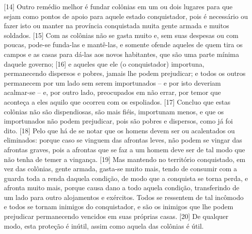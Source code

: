 {[}14{]} Outro remédio melhor é fundar colônias em um ou dois lugares
para que sejam como pontos de apoio para aquele estado conquistador,
pois é necessário ou fazer isto ou manter na província conquistada muita
gente armada e muitos soldados. {[}15{]} Com as colônias não se gasta
muito e, sem suas despesas ou com poucas, pode-se funda-las e mantê-las,
e somente ofende aqueles de quem tira os campos e as casas para dá-las
aos novos habitantes, que são uma parte mínima daquele governo; {[}16{]}
e aqueles que ele (o conquistador) importuna, permanecendo dispersos e
pobres, jamais lhe podem prejudicar; e todos os outros permanecem por um
lado sem serem importunados -- e por isto deveriam acalmar-se -- e, por
outro lado, preocupados em não errar, por temor que aconteça a eles
aquilo que ocorreu com os espoliados. {[}17{]} Concluo que estas
colônias não são dispendiosas, são mais fiéis, importunam menos, e que
os importunados não podem prejudicar, pois são pobres e dispersos, como
já foi dito. {[}18{]} Pelo que há de se notar que os homens devem ser ou
acalentados ou eliminados: porque caso se vinguem das afrontas leves,
não podem se vingar das afrontas graves, pois a afrontas que se faz a um
homem deve ser de tal modo que não tenha de temer a vingança. {[}19{]}
Mas mantendo no território conquistado, em vez das colônias, gente
armada, gasta-se muito mais, tendo de consumir com a guarda toda a renda
daquela condição, de modo que a conquista se torna perda, e afronta
muito mais, porque causa dano a todo aquela condição, transferindo de um
lado para outro alojamentos e exércitos. Todos se ressentem de tal
incômodo e todos se tornam inimigos do conquistador, e são os inimigos
que lhe podem prejudicar permanecendo vencidos em suas próprias casas.
{[}20{]} De qualquer modo, esta proteção é inútil, assim como aquela das
colônias é útil.

